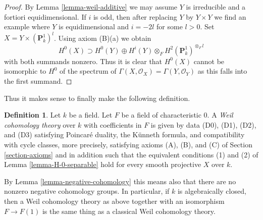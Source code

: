 \documentclass{stacks-project}
\theoremstyle{plain}
\theoremstyle{definition}
\newtheorem{definition}[subsection]{Definition}
\theoremstyle{remark}
\numberwithin{equation}{subsection}
\begin{document}
\begin{proof}
By Lemma \ref{lemma-weil-additive} we may assume $Y$ is irreducible
and a fortiori equidimensional. If $i$ is odd, then after replacing
$Y$ by $Y \times Y$ we find an example where $Y$ is equidimensional
and $i = -2l$ for some $l > 0$. Set $X = Y \times (\mathbf{P}^1_k)^l$.
Using axiom (B)(a) we obtain
$$
H^0(X) \supset H^0(Y) \oplus
H^i(Y) \otimes_F H^2(\mathbf{P}^1_k)^{\otimes_F l}
$$
with both summands nonzero. Thus it is clear that $H^0(X)$ cannot be
isomorphic to $H^0$ of the spectrum of
$\Gamma(X, \mathcal{O}_X) = \Gamma(Y, \mathcal{O}_Y)$
as this falls into the first summand.
\end{proof}

\noindent
Thus it makes sense to finally make the following definition.

\begin{definition}
\label{definition-weil-cohomology-theory}
Let $k$ be a field. Let $F$ be a field of characteristic $0$.
A {\it Weil cohomology theory} over $k$ with coefficients in $F$
is given by data (D0), (D1), (D2), and (D3) satisfying
Poincar\'e duality, the K\"unneth formula, and compatibility
with cycle classes, more precisely, satisfying axioms (A), (B), and (C)
of Section \ref{section-axioms}
and in addition such that the equivalent conditions (1) and (2) of
Lemma \ref{lemma-H-0-separable} hold for every smooth projective $X$ over $k$.
\end{definition}

\noindent
By Lemma \ref{lemma-negative-cohomology} this means also that there are no
nonzero negative cohomology groups. In particular, if $k$ is algebraically
closed, then a Weil cohomology theory as above together with an isomorphism
$F \to F(1)$ is the same thing as a classical Weil cohomology theory.
\end{document}
